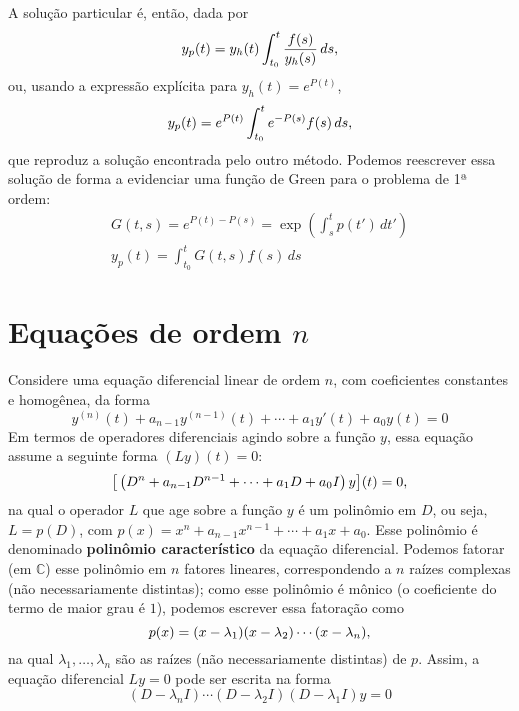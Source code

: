 \documentclass[12pt,a4paper,oneside]{memoir}
\newcommand{\C}{\mathbb{C}}
\begin{document}
A solução particular é, então, dada por
\[
  y_p(t) = y_h(t) \int_{t_0}^{t} \frac{f(s)}{y_h(s)} \,ds \text,
\]
ou, usando a expressão explícita para $y_h(t) = e^{P(t)}$,
\begin{equation}
  y_p(t) = e^{P(t)} \int_{t_0}^{t} e^{-P(s)} f(s)\,ds \text,
\end{equation}
que reproduz a solução encontrada pelo outro método.  Podemos reescrever essa solução de forma a evidenciar uma função de Green para o problema de 1ª ordem:
\begin{gather}
  G(t, s) = e^{P(t)-P(s)} = \exp \left( \int_{s}^{t} p(t')\,dt' \right) \\
  y_p(t) = \int_{t_0}^{t} G(t, s) f(s)\,ds
\end{gather}

\chapter{Equações de ordem $n$}

Considere uma equação diferencial linear de ordem $n$, com coeficientes constantes e homogênea, da forma
\begin{equation}
\label{edo-n-func}
  y^{(n)} (t) + a_{n-1} y^{(n-1)} (t) + \cdots + a_1 y'(t) + a_0 y(t) = 0
\end{equation}
Em termos de operadores diferenciais agindo sobre a função $y$, essa equação assume a seguinte forma $(Ly)(t) = 0$:
\begin{equation}
  \big[ \left( D^n + a_{n-1} D^{n-1} + \cdots + a_1 D + a_0 I \right) y \big] (t) = 0 \text,
\end{equation}
na qual o operador $L$ que age sobre a função $y$ é um polinômio em $D$, ou seja, $L = p(D)$, com $p(x) = x^n + a_{n-1} x^{n-1} + \cdots + a_1 x + a_0$.  Esse polinômio é denominado \textbf{polinômio característico} da equação diferencial.  Podemos fatorar (em $\C$) esse polinômio em $n$ fatores lineares, correspondendo a $n$ raízes complexas (não necessariamente distintas); como esse polinômio é mônico (o coeficiente do termo de maior grau é $1$), podemos escrever essa fatoração como \[
  p(x) = (x - \lambda_1) (x - \lambda_2) \cdots (x - \lambda_n) \text, \]
na qual $\lambda_1, \ldots, \lambda_n$ são as raízes (não necessariamente distintas) de $p$.  Assim, a equação diferencial $Ly = 0$ pode ser escrita na forma
\begin{equation}
  (D - \lambda_n I) \cdots (D - \lambda_2 I) (D - \lambda_1 I) y = 0
\end{equation}
\end{document}
